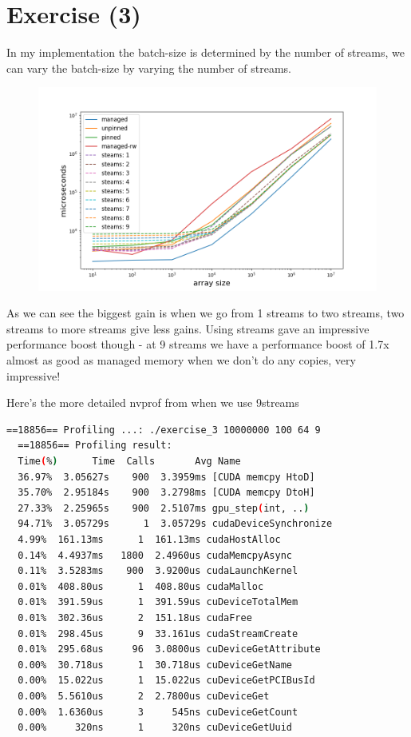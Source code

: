 \documentclass{article}
\begin{document}
\section{Exercise (3)}%
\label{sec:exercise_3_}

In my implementation the batch-size is determined by the number of streams, we can vary the batch-size by varying the number of streams.


\begin{figure}[H]
  \centering
  \includegraphics[width=0.98\linewidth]{ex_3/simulation-time.png}
  \label{fig:}
\end{figure}

As we can see the biggest gain is when we go from 1 streams to two streams, two streams to more streams give less gains. Using streams gave an impressive performance boost though - at 9 streams we have a performance boost of
1.7x almost as good as managed memory when we don't do any copies, very impressive! 

Here's the more detailed nvprof from when we use 9streams


\begin{mdframed}[backgroundcolor=codeColor,leftmargin=0.0cm,hidealllines=true,%
  innerleftmargin=0.1cm,innerrightmargin=0.1cm,innertopmargin=0.5cm,innerbottommargin=0.10cm,
  roundcorner=15pt]
  \begin{lstlisting}[language=bash]
  ==18856== Profiling ...: ./exercise_3 10000000 100 64 9
  ==18856== Profiling result:
  Time(%)      Time  Calls       Avg Name
  36.97%  3.05627s    900  3.3959ms [CUDA memcpy HtoD]
  35.70%  2.95184s    900  3.2798ms [CUDA memcpy DtoH]
  27.33%  2.25965s    900  2.5107ms gpu_step(int, ..)
  94.71%  3.05729s      1  3.05729s cudaDeviceSynchronize
  4.99%  161.13ms      1  161.13ms cudaHostAlloc
  0.14%  4.4937ms   1800  2.4960us cudaMemcpyAsync
  0.11%  3.5283ms    900  3.9200us cudaLaunchKernel
  0.01%  408.80us      1  408.80us cudaMalloc
  0.01%  391.59us      1  391.59us cuDeviceTotalMem
  0.01%  302.36us      2  151.18us cudaFree
  0.01%  298.45us      9  33.161us cudaStreamCreate
  0.01%  295.68us     96  3.0800us cuDeviceGetAttribute
  0.00%  30.718us      1  30.718us cuDeviceGetName
  0.00%  15.022us      1  15.022us cuDeviceGetPCIBusId
  0.00%  5.5610us      2  2.7800us cuDeviceGet
  0.00%  1.6360us      3     545ns cuDeviceGetCount
  0.00%     320ns      1     320ns cuDeviceGetUuid

  \end{lstlisting}
\end{mdframed}
\end{document}
